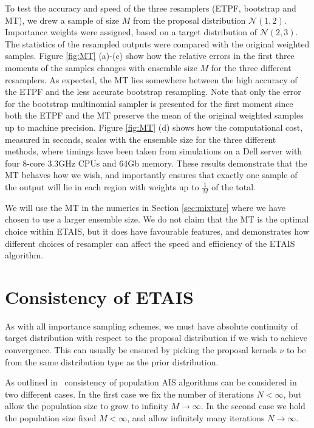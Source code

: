 \documentclass[final]{siamltex}
\begin{document}
To test the accuracy and speed of the three resamplers (ETPF,
bootstrap and MT), we drew a sample of size $M$ from the proposal distribution
$\mathcal{N}(1,2)$. Importance weights were assigned, based on a
target distribution of $\mathcal{N}(2,3)$. The statistics of the
resampled outputs were compared with the original weighted samples. Figure \ref{fig:MT} (a)-(c) show how the relative errors in the first
three moments of the samples changes with ensemble size $M$ for the three different
resamplers. As expected, the MT lies somewhere between the high
accuracy of the ETPF and the less accurate bootstrap
resampling. Note that only the error for the bootstrap multinomial
sampler is presented for the first moment since both the ETPF and the
MT preserve the mean of the original weighted samples up to machine precision. Figure \ref{fig:MT} (d) shows how the computational cost,
measured in seconds, scales with the ensemble size for the three
different methods, where timings have been taken from simulations on a Dell
server with four 8-core 3.3GHz CPUs and 64Gb memory. These results demonstrate that the MT behaves how we wish, and
importantly ensures that exactly one sample of the output will lie in
each region with weights up to $\frac{1}{M}$ of the total.

We will use the MT in the numerics in Section \ref{sec:mixture}
where we have chosen to use a larger ensemble size. We do not claim
that the MT is the optimal choice within ETAIS, but it does have
favourable features, and demonstrates how different choices of
resampler can affect the speed and efficiency of the ETAIS algorithm.


\section{Consistency of ETAIS}\label{sec:consistency}
{\red As with all importance sampling schemes, we must have absolute
  continuity of target distribution with respect to the proposal
  distribution if we wish to achieve convergence. This can usually be
  ensured by picking the proposal kernels $\nu$ to be from the same
  distribution type as the prior distribution.}
  
As outlined in~\cite{martino2015adaptive} consistency of population AIS algorithms can be considered in two different cases. In the first case we fix the number of iterations $N < \infty$, but allow the population size to grow to infinity $M\rightarrow\infty$. In the second case we hold the population size fixed $M<\infty$, and allow infinitely many iterations $N\rightarrow\infty$.
\end{document}
